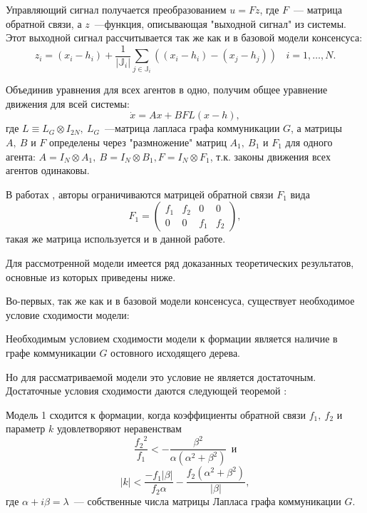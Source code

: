Управляющий сигнал получается преобразованием $u=Fz$, где $F$~--- матрица обратной связи, а $z$~---функция, описывающая "выходной сигнал" из системы. Этот выходной сигнал рассчитывается так же как и в базовой модели консенсуса:
$$
z_i=(x_i-h_i)+\frac{1}{|\mathbb{J}_i|}\sum_{j\in\mathbb{J}_i}\left((x_i-h_i)-(x_j-h_j)\right)\ \ \ \ i=1,\ldots,N.
$$

Объединив уравнения для всех агентов в одно, получим общее уравнение движения для всей системы:
\begin{equation}
\dot{x}=Ax+BFL(x-h),
\label{eq:linear-motion}
\end{equation}
где $L\equiv L_G\otimes I_{2N},\ L_G$~---матрица лапласа графа коммуникации $G$, а матрицы $A,\ B$ и $F$ определены через "размножение" матриц $A_1,\ B_1$ и $F_1$ для одного агента: $A=I_N\otimes A_1,\ B=I_N\otimes B_1, F=I_N\otimes F_1$, т.к. законы движения всех агентов одинаковы.

В работах \cite{veerman2005flocks}, \cite{lafferriere2005decentralized} авторы ограничиваются матрицей обратной связи $F_1$ вида 
$$F_1=\left( \begin{array}{cccc}
f_1 & f_2 & 0 & 0 \\
0 & 0 & f_1 & f_2 \end{array} \right),$$ такая же матрица используется и в данной работе.

Для рассмотренной модели имеется ряд доказанных теоретических результатов, основные из которых приведены ниже. 

Во-первых, так же как и в базовой модели консенсуса, существует необходимое условие сходимости модели:
\begin{proposition}
Необходимым условием сходимости модели к формации является наличие в графе коммуникации $G$ остовного исходящего дерева.
\end{proposition}

Но для рассматриваемой модели это условие не является достаточным. Достаточные условия сходимости даются следующей теоремой \cite{veerman2005flocks,lafferriere2005decentralized}:

\begin{theorem}
Модель 1 сходится к формации, когда коэффициенты обратной связи $f_1,\ f_2$ и параметр $k$ удовлетворяют неравенствам 
\begin{equation}
\frac{{f_2}^2}{f_1}< -\frac{\beta^2}{\alpha(\alpha^2+\beta^2)}\ \ \text{и}
\end{equation}
\begin{equation}
|k|<\frac{-f_1|\beta|}{f_2\alpha}-\frac{f_2(\alpha^2+\beta^2)}{|\beta|},
\end{equation}
где $\alpha+i\beta=\lambda$~--- собственные числа матрицы Лапласа графа коммуникации $G$.
\end{theorem}

